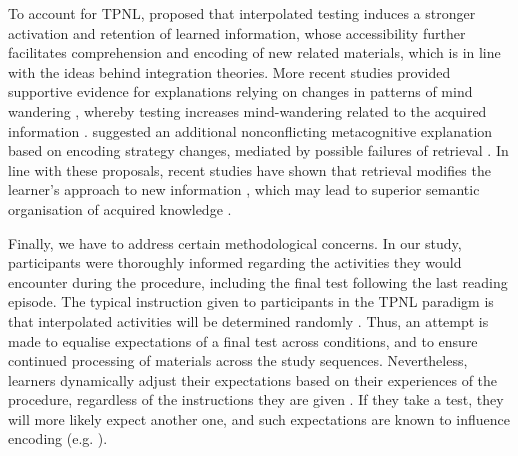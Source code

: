 \documentclass[../main.tex]{subfiles}
\begin{document}
To account for TPNL, \cite{wissmanInterimTestEffect2011} proposed that 
interpolated testing induces a stronger activation and retention of learned 
information, whose accessibility further facilitates comprehension and 
encoding of new related materials, which is in line with the ideas behind 
integration theories. More recent studies provided supportive evidence for 
explanations relying on changes in patterns of mind wandering 
\citep{szpunarInterpolatedMemoryTests2013}, whereby testing increases 
mind-wandering related to the acquired information
\citep{jingInterpolatedTestingInfluences2016}. 
\cite{wissmanInterimTestEffect2011} suggested an additional nonconflicting 
metacognitive explanation based on encoding strategy changes, mediated by 
possible failures of retrieval 
\citep{bahrickImportanceRetrievalFailures2005}. In line with these 
proposals, recent studies have shown that retrieval modifies the learner's 
approach to new information \citep{choTestingEnhancesBoth2017, 
soderstromTestingFacilitatesRegulation2014}, which may lead to superior 
semantic organisation of acquired knowledge 
\citep{chanTestingPotentiatesNew2018, jingInterpolatedTestingInfluences2016}.

Finally, we have to address certain methodological concerns.  In our study, 
participants were thoroughly informed regarding the activities they would 
encounter during the procedure, including the final test following the last 
reading episode. The typical instruction given to participants in the TPNL 
paradigm is that interpolated activities will be determined randomly
\cite{yangEnhancingLearningRetrieval2018}. Thus, an attempt is made to 
equalise expectations of a final test across conditions, and to ensure 
continued processing of materials across the study sequences. Nevertheless, 
learners dynamically adjust their expectations based on their experiences of 
the procedure, regardless of the instructions they are given 
\citep{weinsteinRoleTestExpectancy2014}.  If they take a test, they will 
more likely expect another one, and such expectations are known to influence 
encoding (e.g. \citealp{szpunarExpectationFinalCumulative2007}). 
\end{document}
